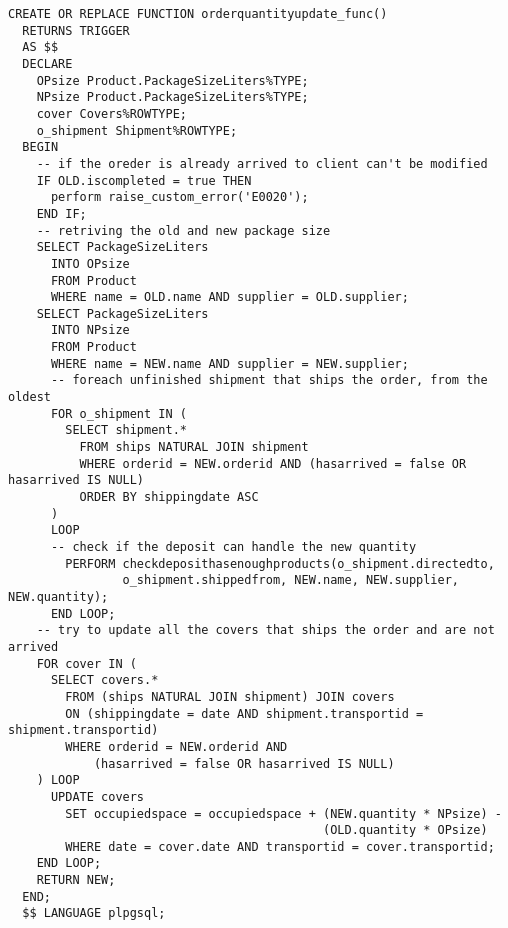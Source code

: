 \begin{lstlisting}[caption={Funzione \textbf{orderquantityupdate}}]
  CREATE OR REPLACE FUNCTION orderquantityupdate_func()
  RETURNS TRIGGER
  AS $$
  DECLARE
    OPsize Product.PackageSizeLiters%TYPE;
    NPsize Product.PackageSizeLiters%TYPE;
    cover Covers%ROWTYPE;
    o_shipment Shipment%ROWTYPE;
  BEGIN
    -- if the oreder is already arrived to client can't be modified
    IF OLD.iscompleted = true THEN
      perform raise_custom_error('E0020');
    END IF;
    -- retriving the old and new package size
    SELECT PackageSizeLiters
      INTO OPsize
      FROM Product
      WHERE name = OLD.name AND supplier = OLD.supplier;
    SELECT PackageSizeLiters
      INTO NPsize
      FROM Product
      WHERE name = NEW.name AND supplier = NEW.supplier;
      -- foreach unfinished shipment that ships the order, from the oldest
      FOR o_shipment IN (
        SELECT shipment.*
          FROM ships NATURAL JOIN shipment
          WHERE orderid = NEW.orderid AND (hasarrived = false OR hasarrived IS NULL)
          ORDER BY shippingdate ASC
      )
      LOOP
      -- check if the deposit can handle the new quantity
        PERFORM checkdeposithasenoughproducts(o_shipment.directedto, 
                o_shipment.shippedfrom, NEW.name, NEW.supplier, NEW.quantity);
      END LOOP;
    -- try to update all the covers that ships the order and are not arrived
    FOR cover IN (
      SELECT covers.* 
        FROM (ships NATURAL JOIN shipment) JOIN covers
        ON (shippingdate = date AND shipment.transportid = shipment.transportid)
        WHERE orderid = NEW.orderid AND 
            (hasarrived = false OR hasarrived IS NULL)
    ) LOOP
      UPDATE covers
        SET occupiedspace = occupiedspace + (NEW.quantity * NPsize) - 
                                            (OLD.quantity * OPsize)
        WHERE date = cover.date AND transportid = cover.transportid;
    END LOOP;
    RETURN NEW;
  END;
  $$ LANGUAGE plpgsql;
\end{lstlisting}

